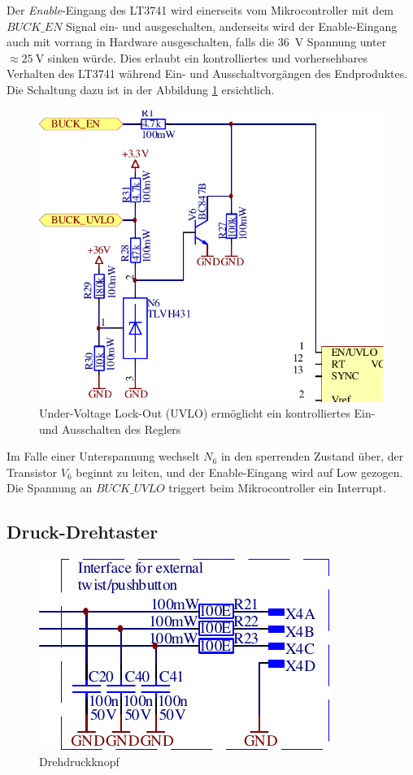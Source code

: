 Der \emph{Enable}-Eingang des LT3741 wird einerseits vom Mikrocontroller mit dem
$BUCK\_EN$  Signal ein- und ausgeschalten, anderseits  wird  der  Enable-Eingang
auch mit vorrang in Hardware ausgeschalten, falls  die  \SI{36}{\volt}  Spannung
unter $\approx  \SI{25}{\volt}$  sinken w\"urde. Dies erlaubt ein kontrolliertes
und vorhersehbares Verhalten  des LT3741 w\"ahrend Ein- und Ausschaltvorg\"angen
des Endproduktes. Die Schaltung dazu ist in der Abbildung \ref{fig:circuit:uvlo}
ersichtlich.

\begin{figure}[th!]
    \center
    \includegraphics[width=.6\textwidth]{images/circuit/uvlo.pdf}
    \caption{Under-Voltage Lock-Out (UVLO) erm\"oglicht ein kontrolliertes Ein- und Ausschalten des Reglers}
    \label{fig:circuit:uvlo}
\end{figure}

Im Falle einer Unterspannung  wechselt  $N_6$  in den sperrenden Zustand \"uber,
der  Transistor $V_6$ beginnt zu leiten, und der  Enable-Eingang  wird  auf  Low
gezogen.  Die  Spannung  an  $BUCK\_UVLO$  triggert  beim  Mikrocontroller   ein
Interrupt.

\subsection{Druck-Drehtaster}

\begin{figure}[th!]
    \center
    \includegraphics[width=.4\textwidth]{images/circuit/pushbutton.pdf}
    \caption{Drehdruckknopf}
    \label{fig:circuit:pushbutton}
\end{figure}

